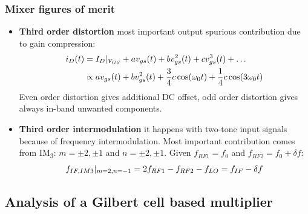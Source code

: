 \begin{frame}
	\frametitle{Mixer figures of merit}
	\begin{itemize}
		\item \textbf{Third order distortion} most important output spurious contribution due to gain compression:
		\begin{align}
			i_D(t) &= I_D|_{V_{GS}}+av_{gs}(t)+bv_{gs}^2(t)+cv_{gs}^3(t)+\dots \notag \\
			& \propto av_{gs}(t)+bv_{gs}^2(t)+\frac{3}{4}c\cos(\omega_0 t) +\frac{1}{4}c\cos(3\omega_0 t) \notag
		\end{align}
		Even order distortion gives additional DC offset, odd order distortion gives always in-band unwanted components.
		\item \textbf{Third order intermodulation} it happens with two-tone input signals because of frequency intermodulation. Most important contribution comes from IM\textsubscript{3}: $m=\pm2,\pm1$ and $n=\pm2,\pm1$. Given $f_{RF1} = f_0$ and $f_{RF2}=f_0+\delta f$:
		\begin{equation}
			f_{IF,IM3}|_{m=2,n=-1} = 2f_{RF1} - f_{RF2} -f_{LO}= f_{IF} - \delta f \notag
		\end{equation} 
	\end{itemize}
\end{frame}

\subsection{Analysis of a Gilbert cell based multiplier}

\begin{frame} %
\tableofcontents[currentsubsection]
\end{frame}


